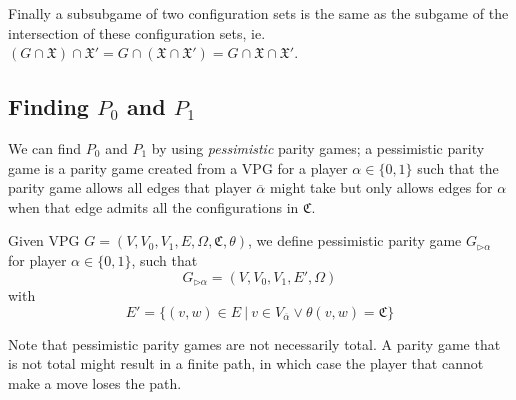 Finally a subsubgame of two configuration sets is the same as the subgame of the intersection of these configuration sets, ie. $(G \cap \mathfrak{X}) \cap \mathfrak{X}' = G \cap (\mathfrak{X} \cap \mathfrak{X}') = G \cap \mathfrak{X} \cap \mathfrak{X}'$.

\subsection{Finding $P_0$ and $P_1$}
We can find $P_0$ and $P_1$ by using \textit{pessimistic} parity games; a pessimistic parity game is a parity game created from a VPG for a player $\alpha \in \{0,1\}$ such that the parity game allows all edges that player $\overline{\alpha}$ might take but only allows edges for $\alpha$ when that edge admits all the configurations in $\mathfrak{C}$.
\begin{definition}
	\label{def_pess_game}
	Given VPG $G = (V,V_0,V_1,E,\Omega, \mathfrak{C},\theta)$, we define pessimistic parity game $G_{\triangleright\alpha}$ for player $\alpha \in \{0,1\}$, such that
	\[ G_{\triangleright\alpha} = (V,V_0,V_1,E',\Omega ) \]
	with
	\[ E' = \{ (v,w) \in E\ |\ v \in V_{\overline{\alpha}} \vee \theta(v,w) = \mathfrak{C} \} \]
\end{definition}


Note that pessimistic parity games are not necessarily total. A parity game that is not total might result in a finite path, in which case the player that cannot make a move loses the path.

